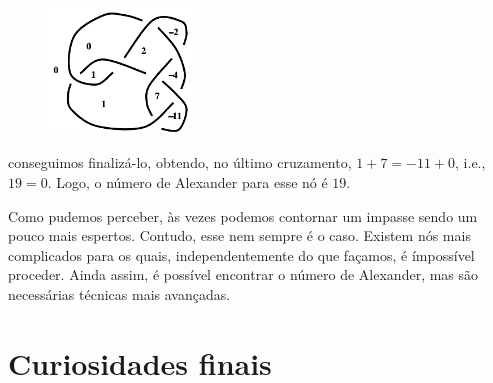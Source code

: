 \documentclass[a4paper,portuguese,11pt,twoside, leqno]{book}
\theoremstyle{definition}
\begin{document}
	\begin{figure}[H]
		\begin{center}
			\includegraphics[width=4cm]{no_preenchimento_completo.png}
		\end{center}
	\end{figure}
	\par\vspace{0.3cm} conseguimos finalizá-lo, obtendo, no último cruzamento, $1+7=-11+0$, i.e., $19=0$. Logo, o número de Alexander para esse nó é $19$.
	\par\vspace{0.3cm} Como pudemos perceber, às vezes podemos contornar um impasse sendo um pouco mais espertos. Contudo, esse nem sempre é o caso. Existem nós mais complicados para os quais, independentemente do que façamos, é ímpossível proceder. Ainda assim, é possível encontrar o número de Alexander, mas são necessárias técnicas mais avançadas.
	\chapter{Curiosidades finais}
\end{document}
